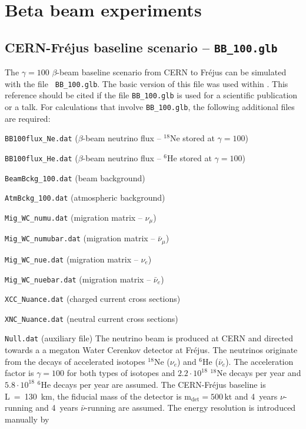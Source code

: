 \section*{Beta beam experiments}
\subsection*{CERN-Fr\'{e}jus baseline scenario -- {\tt BB\_100.glb}}

The $\gamma=100$ $\beta$-beam baseline scenario from CERN to Fr\'{e}jus can be simulated with the file {\tt
BB\_100.glb}. The basic version of this file was used within \cite{Campagne:2006yx}. This reference
should be cited if the file {\tt BB\_100.glb} is used for a scientific publication or a talk. For calculations that
involve {\tt BB\_100.glb}, the following additional files are required: 
\bi
\item {\tt BB100flux\_Ne.dat} ($\beta$-beam neutrino flux -- $^{18}$Ne stored at $\gamma=100$)
\item {\tt BB100flux\_He.dat} ($\beta$-beam neutrino flux -- $^{6}$He stored at $\gamma=100$)
\item {\tt BeamBckg\_100.dat} (beam background)
\item {\tt AtmBckg\_100.dat} (atmospheric background)
\item {\tt Mig\_WC\_numu.dat} (migration matrix -- $\nu_\mu$)
\item {\tt Mig\_WC\_numubar.dat} (migration matrix -- $\bar{\nu}_\mu$)
\item {\tt Mig\_WC\_nue.dat} (migration matrix -- $\nu_e$)
\item {\tt Mig\_WC\_nuebar.dat} (migration matrix -- $\bar{\nu}_e$)
\item {\tt XCC\_Nuance.dat} (charged current cross sections)
\item {\tt XNC\_Nuance.dat} (neutral current cross sections)
\item {\tt Null.dat} (auxiliary file)
\ei
The neutrino beam is produced at CERN and directed towards a a megaton Water Cerenkov detector at Fr\'{e}jus. 
The neutrinos originate from the decays of accelerated isotopes $^{18}$Ne ($\nu_e$) and $^6$He ($\bar{\nu}_e$).
The acceleration factor is $\gamma=100$ for both types of isotopes and $2.2\cdot10^{18}$ $^{18}$Ne decays per
year and $5.8\cdot10^{18}$ $^{6}$He decays per year are assumed. The CERN-Fr\'{e}jus baseline is L~=~130~km, the
fiducial mass of the detector is $\mathrm{m_{det} = 500 \,kt}$ and 4~years $\nu$-running and 4~years
$\bar{\nu}$-running are assumed. The energy resolution is introduced manually by
